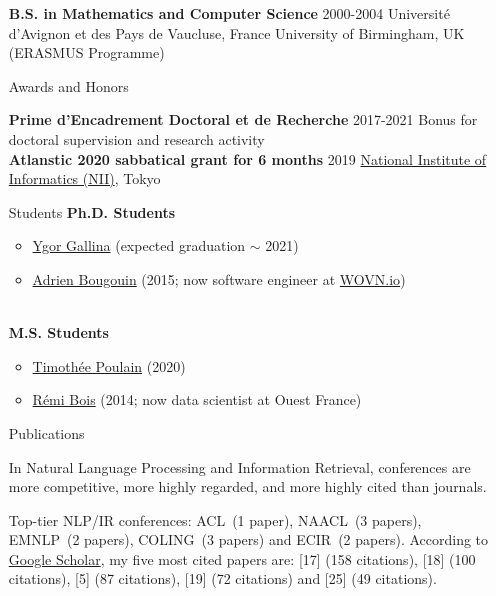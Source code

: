 \documentclass[11pt,a4paper]{article}
\begin{document}
\begin{itemize}
\textbf{B.S. in Mathematics and Computer Science} \hfill 2000-2004 \newline
Université d'Avignon et des Pays de Vaucluse, France \newline
University of Birmingham, UK (ERASMUS Programme)

\item[Awards and Honors]

\textbf{Prime d'Encadrement Doctoral et de Recherche} \hfill 2017-2021 \newline
Bonus for doctoral supervision and research activity \\[-.5cm]

\textbf{Atlanstic 2020 sabbatical grant for 6 months} \hfill 2019 \newline
\href{https://www.nii.ac.jp/en/}{National Institute of Informatics (NII)}, Tokyo


\item[Students]
\textbf{Ph.D. Students}
\begin{itemize}[nosep,topsep=-0.2cm,leftmargin=!,labelsep*=.3cm,label=$\Yright$]
\item \href{https://github.com/ygorg}{Ygor Gallina} 
      (expected graduation $\sim$ 2021) 
\item \href{http://adrien-bougouin.github.io/}{Adrien Bougouin} 
      (2015; now software engineer at \href{https://wovn.io/}{WOVN.io}) 
\end{itemize}~\\[-.2cm]
%
\textbf{M.S. Students}
\begin{itemize}[nosep,topsep=-0.2cm,leftmargin=!,labelsep*=.3cm,label=$\Yright$]
\item \href{https://github.com/Oulaolay}{Timothée Poulain} (2020)
\item \href{https://www.ledatablog.com/}{Rémi Bois} (2014; now data scientist at Ouest France) 
\end{itemize}

\item[Publications]

In Natural Language Processing and Information Retrieval, conferences are more 
competitive, more highly regarded, and more highly cited than journals.


Top-tier NLP/IR conferences:  ACL~(1 paper), NAACL~(3 papers), EMNLP~(2 papers), COLING~(3 papers) and ECIR~(2 papers).
%
%
According to \href{https://scholar.google.com/citations?user=Vk68rbkAAAAJ}{Google Scholar}, my five most cited papers are: [17] {\small (158 citations)}, [18] {\small (100 citations)}, [5] {\small (87 citations)}, [19] {\small (72 citations)} and [25] {\small (49 citations)}.



\end{itemize}
\end{document}
